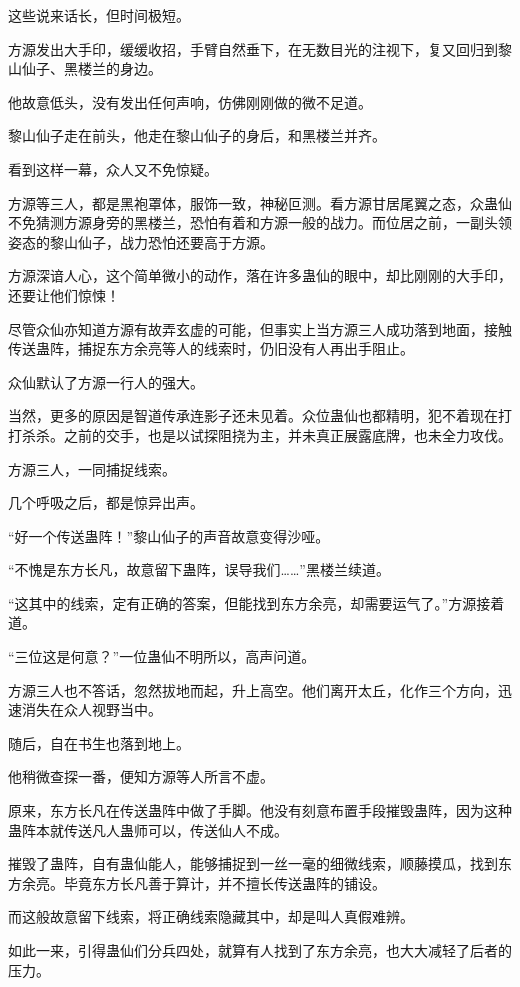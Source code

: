 \begin{this_body}
这些说来话长，但时间极短。

方源发出大手印，缓缓收招，手臂自然垂下，在无数目光的注视下，复又回归到黎山仙子、黑楼兰的身边。

他故意低头，没有发出任何声响，仿佛刚刚做的微不足道。

黎山仙子走在前头，他走在黎山仙子的身后，和黑楼兰并齐。

看到这样一幕，众人又不免惊疑。

方源等三人，都是黑袍罩体，服饰一致，神秘叵测。看方源甘居尾翼之态，众蛊仙不免猜测方源身旁的黑楼兰，恐怕有着和方源一般的战力。而位居之前，一副头领姿态的黎山仙子，战力恐怕还要高于方源。

方源深谙人心，这个简单微小的动作，落在许多蛊仙的眼中，却比刚刚的大手印，还要让他们惊悚！

尽管众仙亦知道方源有故弄玄虚的可能，但事实上当方源三人成功落到地面，接触传送蛊阵，捕捉东方余亮等人的线索时，仍旧没有人再出手阻止。

众仙默认了方源一行人的强大。

当然，更多的原因是智道传承连影子还未见着。众位蛊仙也都精明，犯不着现在打打杀杀。之前的交手，也是以试探阻挠为主，并未真正展露底牌，也未全力攻伐。

方源三人，一同捕捉线索。

几个呼吸之后，都是惊异出声。

“好一个传送蛊阵！”黎山仙子的声音故意变得沙哑。

“不愧是东方长凡，故意留下蛊阵，误导我们……”黑楼兰续道。

“这其中的线索，定有正确的答案，但能找到东方余亮，却需要运气了。”方源接着道。

“三位这是何意？”一位蛊仙不明所以，高声问道。

方源三人也不答话，忽然拔地而起，升上高空。他们离开太丘，化作三个方向，迅速消失在众人视野当中。

随后，自在书生也落到地上。

他稍微查探一番，便知方源等人所言不虚。

原来，东方长凡在传送蛊阵中做了手脚。他没有刻意布置手段摧毁蛊阵，因为这种蛊阵本就传送凡人蛊师可以，传送仙人不成。

摧毁了蛊阵，自有蛊仙能人，能够捕捉到一丝一毫的细微线索，顺藤摸瓜，找到东方余亮。毕竟东方长凡善于算计，并不擅长传送蛊阵的铺设。

而这般故意留下线索，将正确线索隐藏其中，却是叫人真假难辨。

如此一来，引得蛊仙们分兵四处，就算有人找到了东方余亮，也大大减轻了后者的压力。


\end{this_body}
